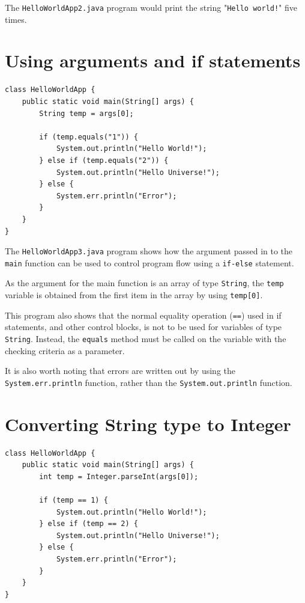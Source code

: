\documentclass[a4paper]{systems-software}
\begin{document}
The \texttt{HelloWorldApp2.java} program would print the string "\texttt{Hello world!}" five times.


\newpage

\section*{Using arguments and if statements}

\begin{lstlisting}[title={HelloWorldApp3.java}]
class HelloWorldApp {
	public static void main(String[] args) {
		String temp = args[0];
		
		if (temp.equals("1")) {
			System.out.println("Hello World!");
		} else if (temp.equals("2")) {
			System.out.println("Hello Universe!");
		} else {
			System.err.println("Error");
		}
	}
}
\end{lstlisting}

The \texttt{HelloWorldApp3.java} program shows how the argument passed in to the \texttt{main} function can be used to control program flow using a \texttt{if-else} statement.

As the argument for the main function is an array of type \texttt{String}, the \texttt{temp} variable is obtained from the first item in the array by using \texttt{temp[0]}.

This program also shows that the normal equality operation (\texttt{==}) used in if statements, and other control blocks, is not to be used for variables of type \texttt{String}. Instead, the \texttt{equals} method must be called on the variable with the checking criteria as a parameter.

It is also worth noting that errors are written out by using the \texttt{System.err.println} function, rather than the \texttt{System.out.println} function.


\section*{Converting String type to Integer}

\begin{lstlisting}[title={HelloWorldApp4.java}]
class HelloWorldApp {
	public static void main(String[] args) {
		int temp = Integer.parseInt(args[0]);
		
		if (temp == 1) {
			System.out.println("Hello World!");
		} else if (temp == 2) {
			System.out.println("Hello Universe!");
		} else {
			System.err.println("Error");
		}
	}
}
\end{lstlisting}
\end{document}
